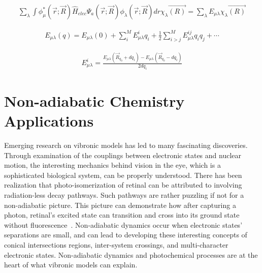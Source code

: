 \begin{equation}%
    \begin{split}
            \sum_{\lambda} \int \phi_{\mu}^{*} (\Vec{r};\Vec{R})
            \hat{H}_{elec} \Psi_{a}(\Vec{r};\Vec{R}) \phi_{\lambda} (\Vec{r};\Vec{R}) dr
            \chi_{\lambda} \Vec{(R)}
            = \sum_{\lambda} E_{\mu \lambda} \chi_{\lambda} \Vec{(R)}
    \end{split}
\end{equation}

\begin{equation} \label{eq:17}
    \begin{split}
            E_{\mu \lambda} (q) = E_{\mu \lambda} (0) + \sum_{i}^{M} E_{\mu \lambda}^{i}q_i + \frac{1}{2} 
            \sum_{i>j}^{M} E_{\mu \lambda}^{ij}q_{i}q_{j} + \cdots
    \end{split}
\end{equation}

\begin{equation} \label{eq:18}
    \begin{split}
            E_{\mu \lambda}^{i} = \frac{E_{\mu \lambda} (\Vec{R}_{q_0} + dq_{i}) - E_{\mu \lambda} (\Vec{R}_{q_0} - dq_{i})}{2dq_{i}}
    \end{split}
\end{equation}
\cleardoublepage


\section{Non-adiabatic Chemistry Applications}
Emerging research on vibronic models has led to many fascinating discoveries.  Through examination of the couplings between electronic states and nuclear motion, the interesting mechanics behind vision in the eye, which is a sophisticated biological system, can be properly understood. There has been realization that photo-isomerization of retinal can be attributed to involving radiation-less decay pathways. Such pathways are rather puzzling if not for a non-adiabatic picture. This picture can demonstrate how after capturing a photon, retinal's excited state can transition and cross into its ground state without fluorescence~\cite{schnedermann2016vibronic}. Non-adiabatic dynamics occur when electronic states' separations are small, and can lead to developing these interesting concepts of conical intersections regions, inter-system crossings, and multi-character electronic states. Non-adiabatic dynamics and photochemical processes are at the heart of what vibronic models can explain.

